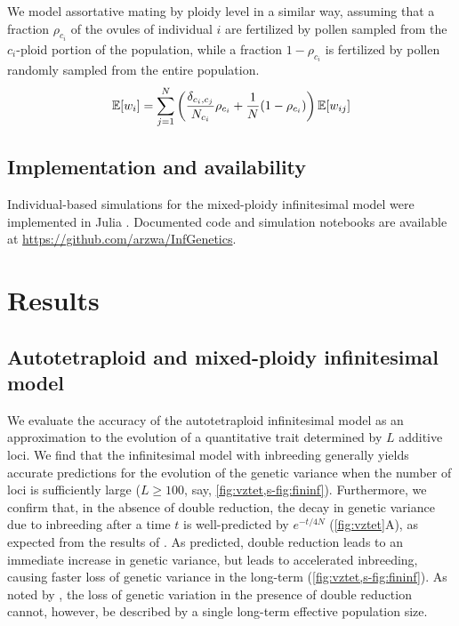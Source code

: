 \documentclass[11pt,a4paper]{article}
\begin{document}
We model assortative mating by ploidy level in a similar way, assuming that a
fraction $\rho_{c_i}$ of the ovules of individual $i$ are fertilized by pollen
sampled from the $c_i$-ploid portion of the population, while a fraction
$1-\rho_{c_i}$ is fertilized by pollen randomly sampled from the entire
population.
\begin{equation}
\mathbb{E}[w_i] = \sum_{j=1}^N \left(\frac{\delta_{c_i,c_j}}{N_{c_i}}\rho_{c_i} +
\frac{1}{N}(1-\rho_{c_i})\right)\mathbb{E}[w_{ij}]
\end{equation}

\subsection*{Implementation and availability}

Individual-based simulations for the mixed-ploidy infinitesimal model were
implemented in Julia \citep{julia}.
Documented code and simulation notebooks are available at
\url{https://github.com/arzwa/InfGenetics}.

\section*{Results}

\subsection*{Autotetraploid and mixed-ploidy infinitesimal model}

We evaluate the accuracy of the autotetraploid infinitesimal model as an
approximation to the evolution of a quantitative trait determined by $L$
additive loci.
We find that the infinitesimal model with inbreeding generally yields accurate
predictions for the evolution of the genetic variance when the number of loci
is sufficiently large ($L \ge 100$, say, \cref{fig:vztet,s-fig:fininf}).
Furthermore, we confirm that, in the absence of double reduction, the decay in
genetic variance due to inbreeding after a time $t$ is well-predicted by
$e^{-t/4N}$ (\cref{fig:vztet}A), as expected from the results of \cite{arnold2012}.
As predicted, double reduction leads to an immediate increase in genetic
variance, but leads to accelerated inbreeding, causing faster loss of genetic
variance in the long-term (\cref{fig:vztet,s-fig:fininf}).
As noted by \cite{arnold2012}, the loss of genetic variation in the presence of
double reduction cannot, however, be described by a single long-term effective
population size.
\end{document}
